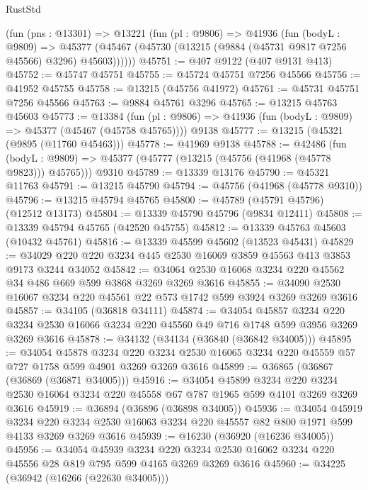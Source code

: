 \begin{lexlean}{RustStd}
\begin{coremodule}
    (fun (pns : @13301) =>
    @13221
      (fun (pl : @9806) =>
      @41936
        (fun (bodyL : @9809) =>
        @45377 (@45467 (@45730 (@13215 (@9884 (@45731 @9817 @7256 @45566) @3296) @45603))))))
@45751 := @407 @9122 (@407 @9131 @413)
@45752 := @45747 @45751
@45755 := @45724 @45751 @7256 @45566
@45756 := @41952 @45755
@45758 := @13215 (@45756 @41972)
@45761 := @45731 @45751 @7256 @45566
@45763 := @9884 @45761 @3296
@45765 := @13215 @45763 @45603
@45773 := @13384
    (fun (pl : @9806) => @41936 (fun (bodyL : @9809) => @45377 (@45467 (@45758 @45765))))
    @9138
@45777 := @13215 (@45321 (@9895 (@11760 @45463)))
@45778 := @41969 @9138
@45788 := @42486
    (fun (bodyL : @9809) => @45377 (@45777 (@13215 (@45756 (@41968 (@45778 @9823))) @45765)))
    @9310
@45789 := @13339 @13176
@45790 := @45321 @11763
@45791 := @13215 @45790
@45794 := @45756 (@41968 (@45778 @9310))
@45796 := @13215 @45794 @45765
@45800 := @45789 (@45791 @45796) (@12512 @13173)
@45804 := @13339 @45790 @45796 (@9834 @12411)
@45808 := @13339 @45794 @45765 (@42520 @45755)
@45812 := @13339 @45763 @45603 (@10432 @45761)
@45816 := @13339 @45599 @45602 (@13523 @45431)
@45829 := @34029 @220 @220 @3234 @445 @2530 @16069 @3859 @45563 @413 @3853 @9173 @3244 @34052
@45842 := @34064 @2530 @16068 @3234 @220 @45562 @34 @486 @669 @599 @3868 @3269 @3269 @3616
@45855 := @34090 @2530 @16067 @3234 @220 @45561 @22 @573 @1742 @599 @3924 @3269 @3269 @3616
@45857 := @34105 (@36818 @34111)
@45874 := @34054
    @45857
    @3234
    @220
    @3234
    @2530
    @16066
    @3234
    @220
    @45560
    @49
    @716
    @1748
    @599
    @3956
    @3269
    @3269
    @3616
@45878 := @34132 (@34134 (@36840 (@36842 @34005)))
@45895 := @34054
    @45878
    @3234
    @220
    @3234
    @2530
    @16065
    @3234
    @220
    @45559
    @57
    @727
    @1758
    @599
    @4901
    @3269
    @3269
    @3616
@45899 := @36865 (@36867 (@36869 (@36871 @34005)))
@45916 := @34054
    @45899
    @3234
    @220
    @3234
    @2530
    @16064
    @3234
    @220
    @45558
    @67
    @787
    @1965
    @599
    @4101
    @3269
    @3269
    @3616
@45919 := @36894 (@36896 (@36898 @34005))
@45936 := @34054
    @45919
    @3234
    @220
    @3234
    @2530
    @16063
    @3234
    @220
    @45557
    @82
    @800
    @1971
    @599
    @4133
    @3269
    @3269
    @3616
@45939 := @16230 (@36920 (@16236 @34005))
@45956 := @34054
    @45939
    @3234
    @220
    @3234
    @2530
    @16062
    @3234
    @220
    @45556
    @28
    @819
    @795
    @599
    @4165
    @3269
    @3269
    @3616
@45960 := @34225 (@36942 (@16266 (@22630 @34005)))

\end{coremodule}
\end{lexlean}
